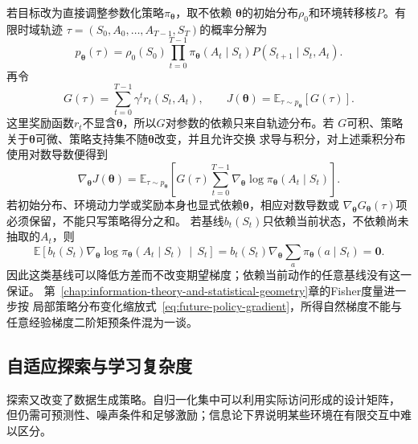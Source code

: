 若目标改为直接调整参数化策略$\pi_{\bm\theta}$，取不依赖
$\bm\theta$的初始分布$\rho_0$和环境转移核$P$。有限时域轨迹
$\tau=(S_0,A_0,\ldots,A_{T-1},S_T)$的概率分解为
\[
  p_{\bm\theta}(\tau)
  =
  \rho_0(S_0)
  \prod_{t=0}^{T-1}
  \pi_{\bm\theta}(A_t\mid S_t)
  P(S_{t+1}\mid S_t,A_t).
\]
再令
\[
  G(\tau)
  =
  \sum_{t=0}^{T-1}\gamma^t r_t(S_t,A_t),
  \qquad
  J(\bm\theta)
  =
  \mathbb{E}_{\tau\sim p_{\bm\theta}}[G(\tau)].
\]
这里奖励函数$r_t$不显含$\bm\theta$，所以$G$对参数的依赖只来自轨迹分布。若
$G$可积、策略关于$\bm\theta$可微、策略支持集不随$\bm\theta$改变，并且允许交换
求导与积分，对上述乘积分布使用对数导数便得到
\begin{equation}
  \nabla_{\bm\theta}J(\bm\theta)
  =
  \mathbb{E}_{\tau\sim p_{\bm\theta}}
  \left[
    G(\tau)
    \sum_{t=0}^{T-1}
    \nabla_{\bm\theta}
    \log\pi_{\bm\theta}(A_t\mid S_t)
  \right].
  \label{eq:future-policy-gradient}
\end{equation}
若初始分布、环境动力学或奖励本身也显式依赖$\bm\theta$，相应对数导数或
\(\nabla_{\bm\theta}G_{\bm\theta}(\tau)\)项必须保留，不能只写策略得分之和。
若基线$b_t(S_t)$只依赖当前状态，不依赖尚未抽取的$A_t$，则
\[
  \mathbb{E}\!\left[
    b_t(S_t)\nabla_{\bm\theta}
    \log\pi_{\bm\theta}(A_t\mid S_t)
    \,\middle|\,S_t
  \right]
  =
  b_t(S_t)\nabla_{\bm\theta}\sum_a\pi_{\bm\theta}(a\mid S_t)
  =
  \bm0.
\]
因此这类基线可以降低方差而不改变期望梯度；依赖当前动作的任意基线没有这一保证。
第~\ref{chap:information-theory-and-statistical-geometry}章的Fisher度量进一步按
局部策略分布变化缩放式~\eqref{eq:future-policy-gradient}，所得自然梯度不能与
任意经验梯度二阶矩预条件混为一谈。

\subsection{自适应探索与学习复杂度}
\label{sec:future-adaptive-sampling-exploration-complexity}

探索又改变了数据生成策略。自归一化集中可以利用实际访问形成的设计矩阵，
但仍需可预测性、噪声条件和足够激励；信息论下界说明某些环境在有限交互中难以区分。

